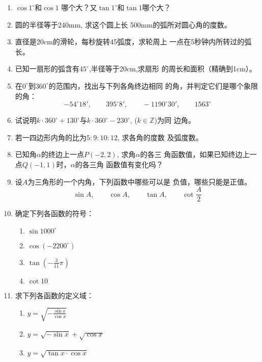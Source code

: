 \begin{enumerate}

    
    \item    $\cos1^{\circ}$和$\cos1$
    哪个大？又$\tan1^{\circ}$和$\tan 1$哪个大？
    \item 圆的半径等于240mm, 求这个圆上长
    500mm的弧所对圆心角的度数。
    \item 直径是20cm的滑轮，每秒旋转45弧度，求轮周上
    一点在5秒钟内所转过的弧长。
    \item 已知一扇形的弧含有$45^{\circ}$,半径等于20cm,求扇形
    的周长和面积（精确到1cm）。
    \item 在$0^{\circ}$到$360^{\circ}$的范围内，找出与下列各角终边相同
    的角，并判定它们是哪个象限的角：
\[-54^{\circ}18',\qquad 395^{\circ}8',\qquad -1190^{\circ}30',\qquad 1563^{\circ}\]

\item 试说明$k\cdot 360^{\circ}+130^{\circ}$与$k\cdot 360^{\circ}-230^{\circ}$, ($k\in\mathbb{Z}$)为同
边角。
\item 若一四边形内角的比为$5:9:10:12$, 求各角的度数
及弧度数。
\item 已知角$\alpha$的终边上一点$P(-2,2)$, 求角$\alpha$的各三
角函数值，如果已知终边上一点$Q(-1,1)$时，$\alpha$的各三角
函数值有变化吗？
\item 设$A$为三角形的一个内角，下列函数中哪些可以是
负值，哪些只能是正值。
\[\sin A,\qquad \cos A,\qquad \tan A,\qquad \cot\frac{A}{2}\]
\item 确定下列各函数的符号：
\begin{multicols}{2}
\begin{enumerate}
    \item $\sin1000^{\circ}$
    \item $\cos(-2200^{\circ})$
    \item $\tan\left(-\frac{3}{11}\pi\right)$
    \item $\cot 10$
\end{enumerate}
\end{multicols}

\item 求下列各函数的定义域：
\begin{multicols}{2}
    \begin{enumerate}
        \item $y=\sqrt{-\frac{\sin x}{\cos x}}$
        \item $y=\sqrt{-\sin x}+\sqrt{\cos x}$
        \item $y=\sqrt{\tan x\cdot \cos x}$
    \end{enumerate}
    \end{multicols}


\end{enumerate}
